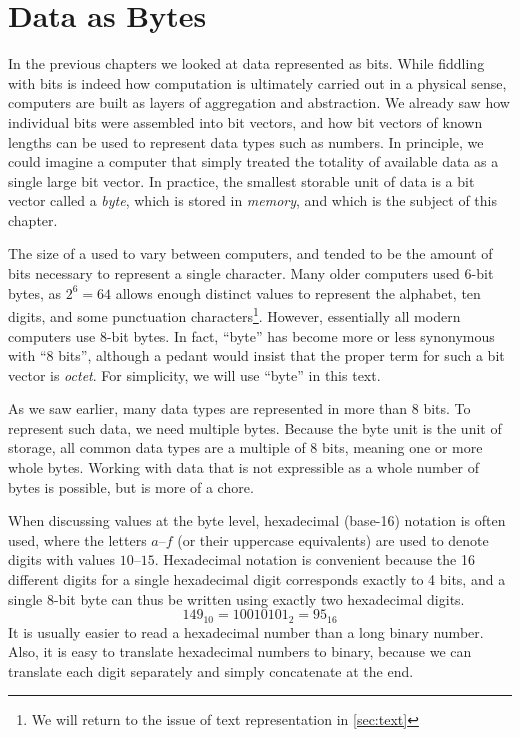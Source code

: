 \chapter{Data as Bytes}
\label{chap:bytes}

In the previous chapters we looked at data represented as bits.  While
fiddling with bits is indeed how computation is ultimately carried out
in a physical sense, computers are built as layers of aggregation and
abstraction.  We already saw how individual bits were assembled into
bit vectors, and how bit vectors of known lengths can be used to
represent data types such as numbers.  In principle, we could imagine
a computer that simply treated the totality of available data as a
single large bit vector.  In practice, the smallest storable unit of
data is a bit vector called a \emph{byte}, which is stored in
\emph{memory}, and which is the subject of this chapter.

The size of a used to vary between computers, and tended to be the
amount of bits necessary to represent a single character.  Many older
computers used 6-bit bytes, as $2^{6}=64$ allows enough distinct
values to represent the alphabet, ten digits, and some punctuation
characters\footnote{We will return to the issue of text representation
  in \cref{sec:text}}.  However, essentially all modern computers use
8-bit bytes.  In fact, ``byte'' has become more or less synonymous
with ``8 bits'', although a pedant would insist that the proper term
for such a bit vector is \emph{octet}.  For simplicity, we will use
``byte'' in this text.

As we saw earlier, many data types are represented in more than 8
bits.  To represent such data, we need multiple bytes.  Because the
byte unit is the unit of storage, all common data types are a multiple
of 8 bits, meaning one or more whole bytes.  Working with data that is
not expressible as a whole number of bytes is possible, but is more of
a chore.

When discussing values at the byte level, hexadecimal (base-16)
notation is often used, where the letters $a$--$f$ (or their uppercase
equivalents) are used to denote digits with values $10$--$15$.
Hexadecimal notation is convenient because the 16 different digits for
a single hexadecimal digit corresponds exactly to 4 bits, and a single
8-bit byte can thus be written using exactly two hexadecimal digits.
\begin{equation}
  149_{10} = 10010101_{2} = 95_{16}
\end{equation}
It is usually easier to read a hexadecimal number than a long binary
number. Also, it is easy to translate hexadecimal numbers to binary,
because we can translate each digit separately and simply concatenate
at the end.

